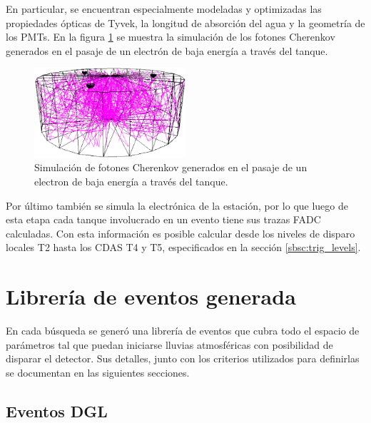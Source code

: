 		En particular, se encuentran especialmente modeladas y optimizadas las propiedades \'opticas de Tyvek, la longitud de absorci\'on del agua y la geometr\'ia de los PMTs.
		En la figura \ref{fig:cher_tank_sim} se muestra la simulaci\'on de los fotones Cherenkov generados en el pasaje de un electr\'on de baja energ\'ia a trav\'es del tanque.
		\begin{figure}[h!]
			\begin{center}
			\includegraphics[width=0.5\textwidth]{fig/simulacionAuger/cher_tank_sim}
			\caption{Simulaci\'on de fotones Cherenkov generados en el pasaje de un electron de baja energ\'ia a trav\'es del tanque.}
			\label{fig:cher_tank_sim}
			\end{center}
		\end{figure}
		
		Por \'ultimo tambi\'en se simula la electr\'onica de la estaci\'on, por lo que luego de esta etapa cada tanque involucrado en un evento tiene sus trazas FADC calculadas.
		Con esta informaci\'on es posible calcular desde los niveles de disparo locales T2 hasta los CDAS T4 y T5, especificados en la secci\'on \ref{sbsc:trig_levels}.
		
	\section{Librería de eventos generada}
	\label{sc:libGen}
	
	En cada búsqueda se generó una librería de eventos que cubra todo el espacio de parámetros tal que puedan iniciarse lluvias atmosf\'ericas con posibilidad de disparar el detector.
	Sus detalles, junto con los criterios utilizados para definirlas se documentan en las siguientes secciones.
	
		\subsection{Eventos DGL}
		
